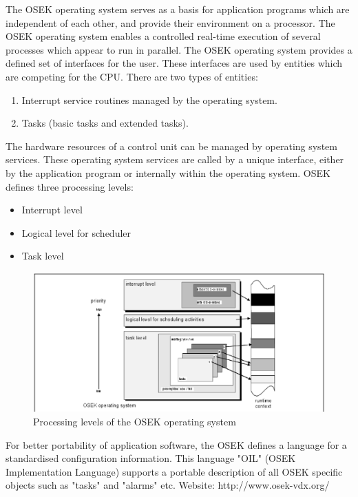 The OSEK operating system serves as a basis for application programs which are independent
of each other, and provide their environment on a processor. The OSEK operating system
enables a controlled real-time execution of several processes which appear to run in parallel.
The OSEK operating system provides a defined set of interfaces for the user. These interfaces
are used by entities which are competing for the CPU. There are two types of entities:
\begin{enumerate}
\item Interrupt service routines managed by the operating system.
\item Tasks (basic tasks and extended tasks).
\end{enumerate}

The hardware resources of a control unit can be managed by operating system services. These
operating system services are called by a unique interface, either by the application program or
internally within the operating system.
OSEK defines three processing levels:
\begin{itemize}
\item  Interrupt level
\item Logical level for scheduler
\item Task level
\end{itemize}

\begin{figure}[htbp]
\begin{center}
\includegraphics[scale=0.4]{figures/nxtosek/osektask.eps}
\caption{Processing levels of the OSEK operating system}
\end{center}
\end{figure}
For better portability of application software, the OSEK defines a language for a standardised
configuration information. This language "OIL" (OSEK Implementation Language) supports a
portable description of all OSEK specific objects such as "tasks" and "alarms" etc.
Website: http://www.osek-vdx.org/
